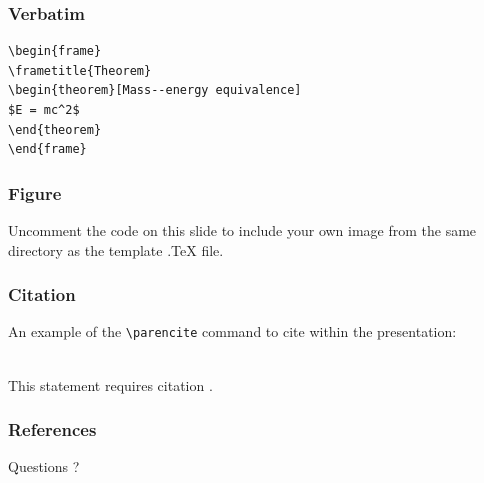 \documentclass[french]{beamer}
\begin{document}

\begin{frame}[fragile] %
\frametitle{Verbatim}
\begin{example}
\begin{verbatim}
\begin{frame}
\frametitle{Theorem}
\begin{theorem}[Mass--energy equivalence]
$E = mc^2$
\end{theorem}
\end{frame}\end{verbatim}
\end{example}
\end{frame}


\begin{frame}
\frametitle{Figure}
Uncomment the code on this slide to include your own image from the same directory as the template .TeX file.
\end{frame}


\begin{frame}[fragile] %
\frametitle{Citation}
An example of the \verb|\parencite| command to cite within the presentation:\\~

This statement requires citation \parencite{Ganter1999}.
\end{frame}

\begin{frame}[allowframebreaks]
\frametitle{References}
\printbibliography
\end{frame}
\begin{frame}
\Huge{\centerline{Questions ?}}
\end{frame}
\end{document}
